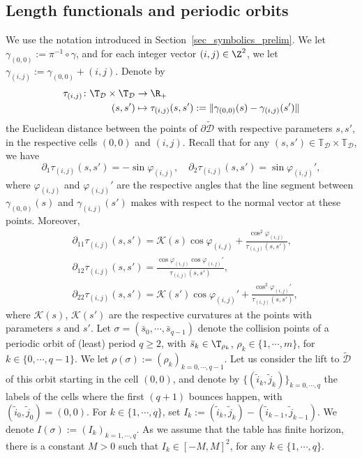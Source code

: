 \documentclass[reqno,11pt]{amsart}
\begin{document}
\subsection{Length functionals and periodic orbits}
We use the notation introduced in Section~\ref{sec_symbolics_prelim}. We let \( \gamma_{(0,0)}:=\pi^{-1}\circ \gamma \), and for each integer vector \( (i,j)\in \Z^2 \), we let \( \gamma_{(i,j)}:=\gamma_{(0,0)}+(i,j) \). 
Denote by
\begin{align*}
    \tau_{(i,j)} \colon \T_\mathcal{D}\times \T_\mathcal{D} &\to \R_+ \\ 
    (s,s')& \mapsto \tau_{(i,j)}(s,s'):=\|\gamma_{(0,0)}(s)-\gamma_{(i,j)}(s')\|
\end{align*}
the Euclidean distance between the points of \( \partial \widetilde{\mathcal{D}} \) with respective parameters \( s,s' \), in the respective cells \( (0,0) \) and \( (i,j) \). 
 Recall that for any \( (s,s')\in \mathbb{T}_\mathcal{D} \times \mathbb{T}_\mathcal{D} \), we have
\begin{equation}\label{eq:first_gen_fct}
    \partial_1 \tau_{(i,j)}(s,s')=-\sin \varphi_{(i,j)},\quad \partial_2 \tau_{(i,j)}(s,s')=\sin \varphi_{(i,j)}',
\end{equation}
where \( \varphi_{(i,j)} \) and \( \varphi_{(i,j)}' \) are the respective angles that the line segment between \( \gamma_{(0,0)}(s) \) and \( \gamma_{(i,j)}(s') \) makes with respect to the normal vector at these points. 
Moreover,
\begin{equation}\label{eq:der_seconde_gen} 
\begin{array}{ll}
    &\partial_{11} \tau_{(i,j)}(s,s')=\mathcal{K}(s)\cos \varphi_{(i,j)}+\frac{\cos^2 \varphi_{(i,j)}}{\tau_{(i,j)}(s,s')},\\
    &\partial_{12} \tau_{(i,j)}(s,s')=\frac{\cos \varphi_{(i,j)}\cos\varphi_{(i,j)}'}{\tau_{(i,j)}(s,s')},\\
    &\partial_{22} \tau_{(i,j)}(s,s')=\mathcal{K}(s')\cos \varphi_{(i,j)}'+\frac{\cos^2 \varphi_{(i,j)}'}{\tau_{(i,j)}(s,s')},
\end{array} 
\end{equation}
where $\mathcal{K}(s)$, $\mathcal{K}(s')$ are the respective curvatures at the points with parameters $s$ and $s'$. 
Let \( \sigma=(\bar s_{0},\cdots,\bar s_{q-1}) \) denote the collision points of a periodic orbit of (least) period \( q \geq 2 \), with \( \bar s_k\in \T_{\rho_k} \), \( \rho_k\in \{1,\cdots,m\} \), for \( k\in \{0,\cdots,q-1\} \). We let \( \rho(\sigma):=(\rho_k)_{k=0,\cdots,q-1} \). 
Let us consider the lift to \( \widetilde{\mathcal{D}} \) of this orbit starting in the cell \( (0,0) \), and denote by  \( \{(\tilde i_k,\tilde j_k)\}_{k=0,\cdots,q} \) the labels of the cells where the first \( (q+1) \) bounces happen, with \( (\tilde i_0,\tilde j_0)=(0,0) \).
For \( k\in \{1,\cdots,q\} \), set \( I_k:=(\tilde i_k,\tilde j_k)-(\tilde i_{k-1},\tilde j_{k-1}) \). We denote \( I(\sigma):=(I_k)_{k=1,\cdots,q} \).
As we assume that the table has finite horizon, there is a constant \( M > 0 \) such that \( I_k\in [-M,M]^{2} \), for any \( k\in \{1,\cdots,q\} \). 
\end{document}
